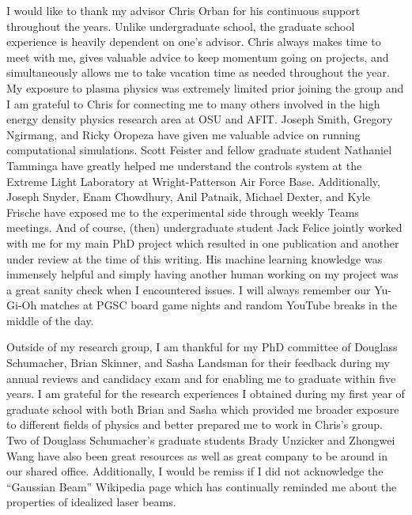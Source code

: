 \begin{acknowledgments}
I would like to thank my advisor Chris Orban for his continuous support throughout the years. Unlike undergraduate school, the graduate school experience is heavily dependent on one's advisor. Chris always makes time to meet with me, gives valuable advice to keep momentum going on projects, and simultaneously allows me to take vacation time as needed throughout the year. My exposure to plasma physics was extremely limited prior joining the group and I am grateful to Chris for connecting me to many others involved in the high energy density physics research area at OSU and AFIT. Joseph Smith, Gregory Ngirmang, and Ricky Oropeza have given me valuable advice on running computational simulations. Scott Feister and fellow graduate student Nathaniel Tamminga have greatly helped me understand the controls system at the Extreme Light Laboratory at Wright-Patterson Air Force Base. Additionally, Joseph Snyder, Enam Chowdhury, Anil Patnaik, Michael Dexter, and Kyle Frische have exposed me to the experimental side through weekly Teams meetings. And of course, (then) undergraduate student Jack Felice jointly worked with me for my main PhD project which resulted in one publication and another under review at the time of this writing. His machine learning knowledge was immensely helpful and simply having another human working on my project was a great sanity check when I encountered issues. I will always remember our Yu-Gi-Oh matches at PGSC board game nights and random YouTube breaks in the middle of the day.

Outside of my research group, I am thankful for my PhD committee of Douglass Schumacher, Brian Skinner, and Sasha Landsman for their feedback during my annual reviews and candidacy exam and for enabling me to graduate within five years. I am grateful for the research experiences I obtained during my first year of graduate school with both Brian and Sasha which provided me broader exposure to different fields of physics and better prepared me to work in Chris's group. Two of Douglass Schumacher's graduate students Brady Unzicker and Zhongwei Wang have also been great resources as well as great company to be around in our shared office. Additionally, I would be remiss if I did not acknowledge the ``Gaussian Beam'' Wikipedia page which has continually reminded me about the properties of idealized laser beams.


\end{acknowledgments}
